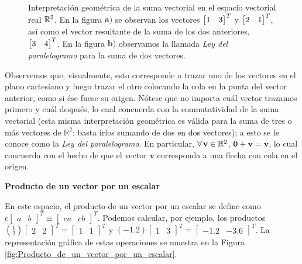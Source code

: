 \documentclass[12pt]{article}
\begin{document}
\begin{figure}[h!]
        \caption{Interpretación geométrica de la suma vectorial en el espacio vectorial real $\protect\mathbb{R}^2$. En la figura $\textbf{a)}$ se observan los vectores $\protect\begin{bmatrix} 1 & 3 \protect\end{bmatrix}^T$ y $\protect\begin{bmatrix} 2 & 1 \protect\end{bmatrix}^T$, así como el vector resultante de la suma de los dos anteriores, $\protect\begin{bmatrix} 3 & 4 \protect\end{bmatrix}^T$. En la figura $\textbf{b)}$ observamos la llamada \emph{Ley del paralelogramo} para la suma de dos vectores.}
    \label{fig:Suma_vectorial}
\end{figure}

    Observemos que, visualmente, esto corresponde a trazar uno de los vectores en el plano cartesiano y luego trazar el otro colocando la cola en la punta del vector anterior, como si ése fuese su origen. Nótese que no importa cuál vector trazamos primero y cuál después, lo cual concuerda con la conmutatividad de la suma vectorial (esta misma interpretación geométrica es válida para la suma de tres o más vectores de $\mathbb{R}^2$: basta irlos sumando de dos en dos vectores); a esto se le conoce como la \textit{Ley del paralelogramo}. En particular, $\forall\hspace{0.5mm} \mathbf{v} \in \mathbb{R}^2$, $\mathbf{0}+\mathbf{v}=\mathbf{v}$, lo cual concuerda con el hecho de que el vector $\mathbf{v}$ corresponda a una flecha con cola en el origen.

\vspace{3mm}
\textbf{Producto de un vector por un escalar}
\vspace{3mm}

        En este espacio, el producto de un vector por un escalar se define como $c\begin{bmatrix}a&b\end{bmatrix}^T\equiv\begin{bmatrix}ca&cb\end{bmatrix}^T$. Podemos calcular, por ejemplo, los productos $(\frac{1}{2})\begin{bmatrix}2&2\end{bmatrix}^T=\begin{bmatrix}1&1\end{bmatrix}^T$ y $(-1.2)\begin{bmatrix}1&3\end{bmatrix}^T=\begin{bmatrix}-1.2&-3.6\end{bmatrix}^T$. La representación gráfica de estas operaciones se muestra en la Figura \ref{fig:Producto_de_un_vector_por_un_escalar}.
\end{document}
